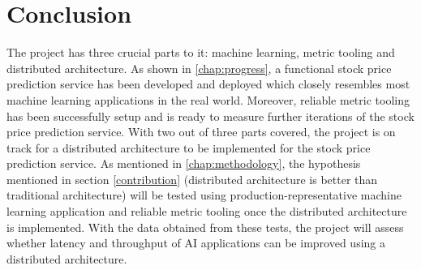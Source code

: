 \documentclass{report}
\def\backmatter{%
    \setcounter{section}{0}
    \renewcommand{\thesection}{\Alph{section}}
}%
\begin{document}
\chapter{Conclusion}\label{chap:conclusion}
The project has three crucial parts to it: machine learning, metric tooling and distributed architecture.
As shown in \cref{chap:progress}, a functional stock price prediction service has been developed and deployed which closely resembles most machine learning applications in the real world.
Moreover, reliable metric tooling has been successfully setup and is ready to measure further iterations of the stock price prediction service.
With two out of three parts covered, the project is on track for a distributed architecture to be implemented for the stock price prediction service.
As mentioned in \cref{chap:methodology}, the hypothesis mentioned in section \ref{contribution} (distributed architecture is better than traditional architecture) will be tested using production-representative machine learning application and reliable metric tooling once the distributed architecture is implemented.
With the data obtained from these tests, the project will assess whether latency and throughput of AI applications can be improved using a distributed architecture.

\backmatter

\printbibliography
\end{document}
